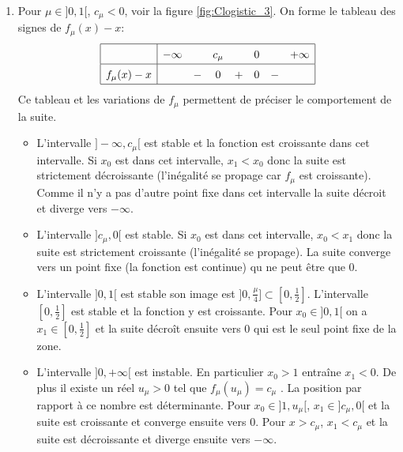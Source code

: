 \begin{enumerate}
 \item Pour $\mu\in]0,1[$, $c_\mu<0$, voir la figure \ref{fig:Clogistic_3}. On forme le tableau des signes de $f_\mu(x)-x$:
\begin{displaymath}
\renewcommand{\arraystretch}{1.5}
 \begin{array}{|c|ccccccc|}
 \hline
           & -\infty &   & c_\mu &   & 0 &   & +\infty \\ \hline
f_\mu(x)-x &         & - & 0     & + & 0 & - & \\ \hline
\end{array}
\end{displaymath}
Ce tableau et les variations de $f_\mu$ permettent de préciser le comportement de la suite.
\begin{itemize}
 \item L'intervalle $]-\infty,c_\mu[$ est stable et la fonction est croissante dans cet intervalle. Si $x_0$ est dans cet intervalle, $x_1<x_0$ donc la suite est strictement décroissante (l'inégalité se propage car $f_\mu$ est croissante). Comme il n'y a pas d'autre point fixe dans cet intervalle la suite décroit et diverge vers $-\infty$.
\item L'intervalle $]c_\mu,0[$ est stable. Si $x_0$ est dans cet intervalle, $x_0<x_1$ donc la suite est strictement croissante (l'inégalité se propage). La suite converge vers un point fixe (la fonction est continue) qu ne peut être que $0$.
\item L'intervalle $]0,1[$ est stable son image est $]0,\frac{\mu}{4}]\subset [0,\frac{1}{2}]$. L'intervalle $[0,\frac{1}{2}]$ est stable et la fonction y est croissante. Pour $x_0\in ]0,1[$ on a $x_1\in [0,\frac{1}{2}]$ et la suite décroît ensuite vers $0$ qui est le seul point fixe de la zone.
\item L'intervalle $]0,+\infty[$ est instable. En particulier $x_0>1$ entraîne $x_1<0$. De plus il existe un réel $u_\mu>0$ tel que $f_\mu(u_\mu)=c_\mu$ . La position par rapport à ce nombre est déterminante.\newline
Pour $x_0 \in ]1,u_\mu[$, $x_1 \in ]c_\mu, 0[$ et la suite est croissante et converge ensuite vers $0$.\newline
Pour $x>c_\mu$, $x_1<c_\mu$ et la suite est décroissante et diverge ensuite vers $-\infty$.
\end{itemize}


\end{enumerate}

